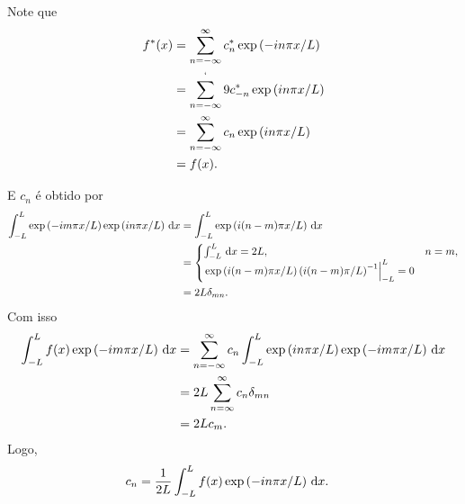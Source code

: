 \begin{obs}
    Note que
    \begin{align*}
        f^*(x) &= \sum_{n = -\infty}^\infty c_n^* \exp\left( -i n \pi x / L \right) \\
        &= \sum_{n = -\infty}^`9 c_{-n}^* \exp\left( i n \pi x / L \right) \\
        &= \sum_{n = -\infty}^\infty c_n \exp\left( i n \pi x / L \right) \\
        &= f(x).
    \end{align*}
\end{obs}

E $c_n$ \'{e} obtido por
\begin{align*}
    \int_{-L}^L \exp\left( -i m \pi x / L \right) \exp\left( i n \pi x / L \right) \, \mathrm{d}x &= \int_{-L}^L \exp\left( i (n - m) \pi x / L \right) \, \mathrm{d}x \\
    &= \begin{cases}
        \int_{-L}^L \, \mathrm{d}x = 2 L, & n = m, \\
        \left. \exp\left( i (n - m) \pi x / L \right) \left( i (n - m) \pi / L \right)^{-1} \right|_{-L}^L = 0
    \end{cases} \\
    &= 2 L \delta_{mn}.
\end{align*}
Com isso
\begin{align*}
    \int_{-L}^L f(x) \exp\left( -i m \pi x / L \right) \, \mathrm{d}x &= \sum_{n = -\infty}^\infty c_n \int_{-L}^L \exp\left( i n \pi x / L \right) \exp\left( -i m \pi x / L \right) \, \mathrm{d}x \\
    &= 2 L \sum_{n = \infty}^\infty c_n \delta_{mn} \\
    &= 2 L c_m.
\end{align*}
Logo,
\begin{align*}
    c_n &= \frac{1}{2L} \int_{-L}^L f(x) \exp\left( -i n \pi x / L \right) \, \mathrm{d}x.
\end{align*}

